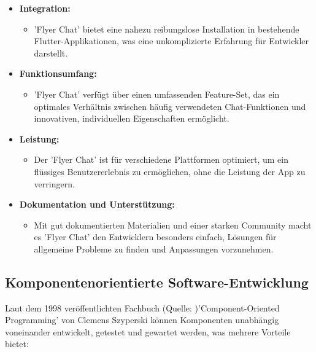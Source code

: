 \begin{itemize}
  \item \textbf{Integration:}
        \begin{itemize}
          \item {'Flyer Chat' bietet eine nahezu reibungslose Installation in bestehende Flutter-Applikationen, was eine unkomplizierte Erfahrung für Entwickler darstellt.}
        \end{itemize}
  \item \textbf{Funktionsumfang:}
        \begin{itemize}
          \item {'Flyer Chat' verfügt über einen umfassenden Feature-Set, das ein optimales Verhältnis zwischen häufig verwendeten Chat-Funktionen und innovativen, individuellen Eigenschaften ermöglicht.}
        \end{itemize}
  \item \textbf{Leistung:}
        \begin{itemize}
          \item {Der 'Flyer Chat' ist für verschiedene Plattformen optimiert, um ein flüssiges Benutzererlebnis zu ermöglichen, ohne die Leistung der App zu verringern.}
        \end{itemize}
  \item \textbf{Dokumentation und Unterstützung:}
        \begin{itemize}
          \item {Mit gut dokumentierten Materialien und einer starken Community macht es 'Flyer Chat' den Entwicklern besonders einfach, Lösungen für allgemeine Probleme zu finden und Anpassungen vorzunehmen.}
        \end{itemize}
\end{itemize}

\subsection{Komponentenorientierte Software-Entwicklung}

Laut dem 1998 veröffentlichten Fachbuch (Quelle: \cite{szyperski-component} )'Component-Oriented Programming' von Clemens Szyperski können Komponenten unabhängig voneinander entwickelt, getestet und gewartet werden, was mehrere Vorteile bietet:

